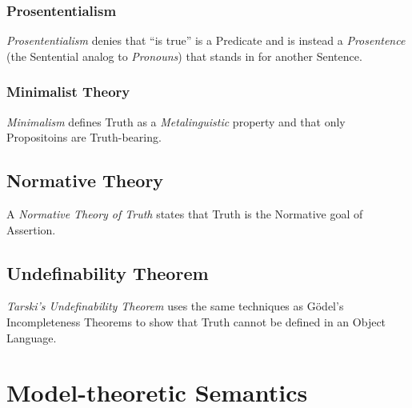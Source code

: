 \subsubsection{Prosententialism}\label{sec:prosententialism}

\emph{Prosententialism} denies that ``is true'' is a Predicate and is
instead a \emph{Prosentence} (the Sentential analog to
\emph{Pronouns}) that stands in for another Sentence.



\subsubsection{Minimalist Theory}\label{sec:minimalist_theory}

\emph{Minimalism} defines Truth as a \emph{Metalinguistic} property
and that only Propositoins are Truth-bearing.



\subsection{Normative Theory}\label{sec:normative_theory}

A \emph{Normative Theory of Truth} states that Truth is the Normative
goal of Assertion.



\subsection{Undefinability Theorem}\label{sec:undefinability_theorem}

\emph{Tarski's Undefinability Theorem} \cite{tarski36} uses the same
techniques as G\"odel's Incompleteness Theorems to show that Truth
cannot be defined in an Object Language.



\section{Model-theoretic Semantics}\label{sec:model_semantics}

